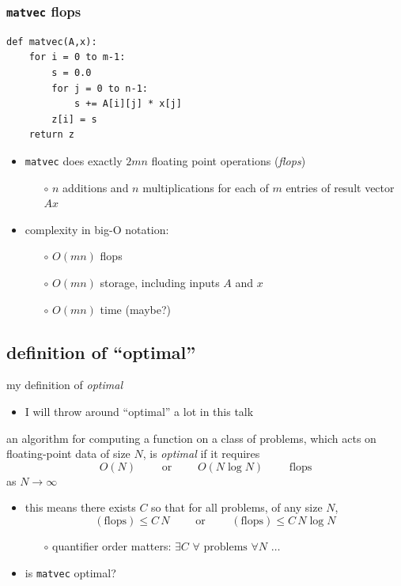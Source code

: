\documentclass[10pt,
               svgnames,
               hyperref={colorlinks,citecolor=DeepPink4,linkcolor=FireBrick,urlcolor=Maroon},
               usepdftitle=false]{beamer}
\newcommand{\ftt}[1]{{\color{blue} \texttt{#1}}}
\newcommand{\optimaldef}{
\begin{definition}
an algorithm for computing a function on a class of problems, which acts on floating-point data of size $N$, is \emph{optimal} if it requires
   $$O(N) \qquad \text{ or } \qquad O(N\log N) \qquad \text{ flops}$$
as $N\to\infty$
\end{definition}
}
\begin{document}
\begin{frame}[fragile]
\frametitle{\texttt{matvec} flops}
\begin{center}
\begin{minipage}{0.7\textwidth}
\begin{verbatim}
def matvec(A,x):
    for i = 0 to m-1:
        s = 0.0
        for j = 0 to n-1:
            s += A[i][j] * x[j]
        z[i] = s
    return z
\end{verbatim}
\end{minipage}
\end{center}

\bigskip
\begin{itemize}
\item \ftt{matvec} does exactly $2mn$ floating point operations (\emph{flops})
    \begin{itemize}
    \item[$\circ$] $n$ additions and $n$ multiplications for each of $m$ entries of result vector $Ax$
    \end{itemize}
\item complexity in big-O notation:
    \begin{itemize}
    \item[$\circ$] $O(mn)$ flops
    \item[$\circ$] $O(mn)$ storage, including inputs $A$ and $x$
    \item[$\circ$] $O(mn)$ time (maybe?)
    \end{itemize}
\end{itemize}
\end{frame}


\subsection{definition of ``optimal''}

\begin{frame}{my definition of \emph{optimal}}

\begin{itemize}
\item I will throw around ``optimal'' a lot in this talk
\end{itemize}

\optimaldef

\begin{itemize}
\item this means there exists $C$ so that for all problems, of any size $N$,
   $$(\text{flops}) \le C\, N \qquad \text{ or } \qquad (\text{flops}) \le C\, N\log N$$

    \begin{itemize}
    \item[$\circ$] quantifier order matters: \quad $\exists C \,\, \forall \text{ problems} \,\, \forall N \,\,  \dots$
    \end{itemize}
\item is \ftt{matvec} optimal?
\end{itemize}
\end{frame}
\end{document}
